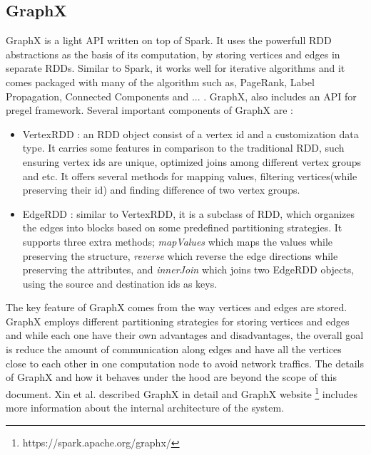 \documentclass[english]{tktltiki}
\begin{document}
\subsection{GraphX}
GraphX is a light API written on top of Spark. It uses the powerfull RDD abstractions as the basis of its computation, by storing vertices and edges in separate RDDs. Similar to Spark, it works well for iterative algorithms and it comes packaged with many of the algorithm such as, PageRank, Label Propagation, Connected Components and ... . GraphX, also includes an API for pregel framework.  Several important components of GraphX are :
\begin{itemize}
\item VertexRDD : an RDD object consist of a vertex id and a customization data type. It carries some features in comparison to the traditional RDD, such ensuring vertex ids are unique, optimized joins among different vertex groups and etc. It offers several methods for mapping values, filtering vertices(while preserving their id) and finding difference of two vertex groups.
\item EdgeRDD : similar to VertexRDD, it is a subclass of RDD, which organizes the edges into blocks based on some predefined partitioning strategies. It supports three extra methods; \textit{mapValues} which maps the values while preserving the structure, \textit{reverse} which reverse the edge directions while preserving the attributes, and \textit{innerJoin} which joins two EdgeRDD objects, using the source and destination ids as keys. 
\end{itemize}
The key feature of GraphX comes from the way vertices and edges are stored. GraphX employs different partitioning strategies for storing vertices and edges and while each one have their own advantages and disadvantages, the overall goal is reduce the amount of communication along edges and have all the vertices close to each other in one computation node to avoid network traffics. The details of GraphX and how it behaves under the hood are beyond the scope of this document. Xin et al. \cite{xin13} described GraphX in detail and GraphX website  \footnote{https://spark.apache.org/graphx/} includes more information about the internal architecture of the system.

\newpage
\end{document}
